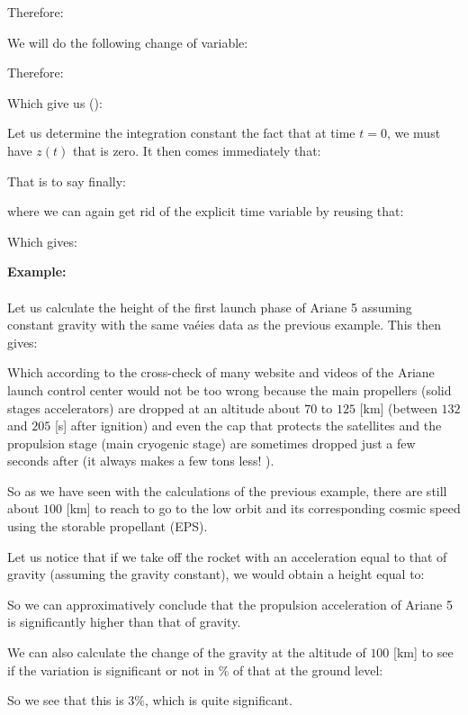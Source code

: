 	Therefore:
	
	We will do the following change of variable:
	
	Therefore:
	
	Which give us ():
	
	Let us determine the integration constant the fact that at time $t = 0$, we must have $z (t)$ that is zero. It then comes immediately that:
	
	That is to say finally:
	
	where we can again get rid of the explicit time variable by reusing that:
	
	Which gives:
	
	\begin{tcolorbox}[colframe=black,colback=white,sharp corners]
	\textbf{{\Large {}}Example:}\\\\
	Let us calculate the height of the first launch phase of Ariane 5 assuming constant gravity with the same vaéies data as the previous example. This then gives:
	
	Which according to the cross-check of many website and videos of the Ariane  launch control center would not be too wrong because the main propellers (solid stages accelerators) are dropped at an altitude about $70$ to $125$ [km] (between $132$ and $205$ [s] after ignition) and even the cap that protects the satellites and the propulsion stage (main cryogenic stage) are sometimes dropped just a few seconds after (it always makes a few tons less! ).
	\end{tcolorbox}
	So as we have seen with the calculations of the previous example, there are still about $100$ [km] to reach to go to the low orbit and its corresponding cosmic speed using the storable propellant (EPS).
	
	Let us notice that if we take off the rocket with an acceleration equal to that of gravity (assuming the gravity constant), we would obtain a height equal to:
	
	So we can approximatively conclude that the propulsion acceleration of Ariane 5 is significantly higher than that of gravity.
	
	We can also calculate the change of the gravity at the altitude of $100$ [km] to see if the variation is significant or not in $\%$ of that at the ground level:
	
	So we see that this is $3\%$, which is quite significant.
	
